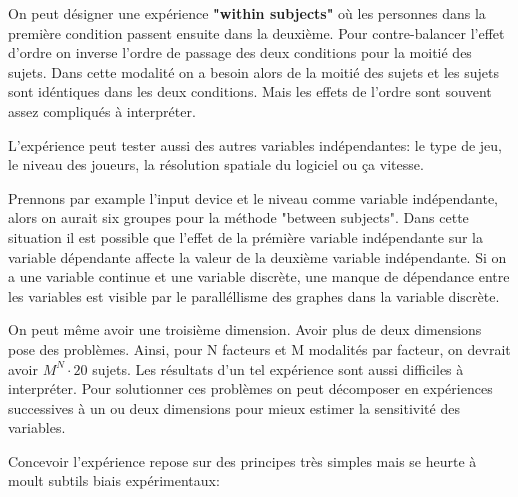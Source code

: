 On peut d\'esigner une exp\'erience \textbf{"within subjects"} o\`u les personnes dans la premi\`ere condition passent ensuite dans la deuxi\`eme. Pour contre-balancer l'effet d'ordre on inverse l'ordre de passage des deux conditions pour la moiti\'e des sujets. Dans cette modalit\'e on a besoin alors de la moiti\'e des sujets et les sujets sont id\'entiques dans les deux conditions. Mais les effets de l'ordre sont souvent assez compliqu\'es \`a interpr\'eter. 

L'exp\'erience peut tester aussi des autres variables ind\'ependantes: le type de jeu, le niveau des joueurs, la r\'esolution spatiale du logiciel ou \c{c}a vitesse. 

Prennons par example l'input device et le niveau comme variable ind\'ependante, alors on aurait six groupes pour la m\'ethode "between subjects". Dans cette situation il est possible que l'effet de la pr\'emi\`ere variable ind\'ependante sur la variable d\'ependante affecte la valeur de la deuxi\`eme variable ind\'ependante. Si on a une variable continue et une variable discr\`ete, une manque de d\'ependance entre les variables est visible par le parall\'ellisme des graphes dans la variable discr\`ete. 

On peut m\^eme avoir une troisi\`eme dimension. Avoir plus de deux dimensions pose des probl\`emes. Ainsi, pour N facteurs et M modalit\'es par facteur, on devrait avoir $M^N \cdot 20$ sujets. Les r\'esultats d'un tel exp\'erience sont aussi difficiles \`a interpr\'eter. Pour solutionner ces probl\`emes on peut d\'ecomposer en exp\'eriences successives \`a un ou deux dimensions pour mieux estimer la sensitivit\'e des variables.

Concevoir l'exp\'erience repose sur des principes tr\`es simples mais se heurte \`a moult subtils biais exp\'erimentaux:

